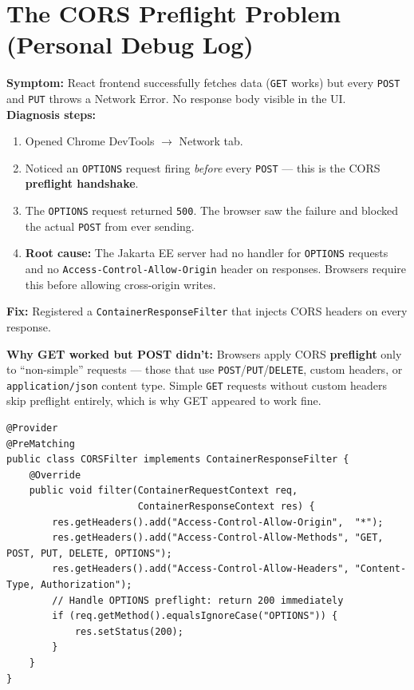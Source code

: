 \documentclass[11pt, letterpaper]{article}
\begin{document}
\section*{The CORS Preflight Problem (Personal Debug Log)}

\begin{tcolorbox}[colback=logbg, colframe=logborder,
  title={\bfseries Debug Log \#001 --- Jakarta EE CORS Failure}, arc=3pt, boxrule=1pt]
\textbf{Symptom:} React frontend successfully fetches data (\texttt{GET} works) but every \texttt{POST} and \texttt{PUT} throws a Network Error. No response body visible in the UI.\\[4pt]
\textbf{Diagnosis steps:}
\begin{enumerate}[noitemsep, leftmargin=*]
  \item Opened Chrome DevTools $\to$ Network tab.
  \item Noticed an \texttt{OPTIONS} request firing \emph{before} every \texttt{POST} --- this is the CORS \textbf{preflight handshake}.
  \item The \texttt{OPTIONS} request returned \texttt{500}. The browser saw the failure and blocked the actual \texttt{POST} from ever sending.
  \item \textbf{Root cause:} The Jakarta EE server had no handler for \texttt{OPTIONS} requests and no \texttt{Access-Control-Allow-Origin} header on responses. Browsers require this before allowing cross-origin writes.
\end{enumerate}
\textbf{Fix:} Registered a \texttt{ContainerResponseFilter} that injects CORS headers on every response.
\end{tcolorbox}

\textbf{Why GET worked but POST didn't:} Browsers apply CORS \textbf{preflight} only to ``non-simple'' requests --- those that use \texttt{POST}/\texttt{PUT}/\texttt{DELETE}, custom headers, or \texttt{application/json} content type. Simple \texttt{GET} requests without custom headers skip preflight entirely, which is why GET appeared to work fine.

\begin{lstlisting}[style=shell, caption={Jakarta EE CORSFilter.java skeleton}]
@Provider
@PreMatching
public class CORSFilter implements ContainerResponseFilter {
    @Override
    public void filter(ContainerRequestContext req,
                       ContainerResponseContext res) {
        res.getHeaders().add("Access-Control-Allow-Origin",  "*");
        res.getHeaders().add("Access-Control-Allow-Methods", "GET, POST, PUT, DELETE, OPTIONS");
        res.getHeaders().add("Access-Control-Allow-Headers", "Content-Type, Authorization");
        // Handle OPTIONS preflight: return 200 immediately
        if (req.getMethod().equalsIgnoreCase("OPTIONS")) {
            res.setStatus(200);
        }
    }
}
\end{lstlisting}
\end{document}
